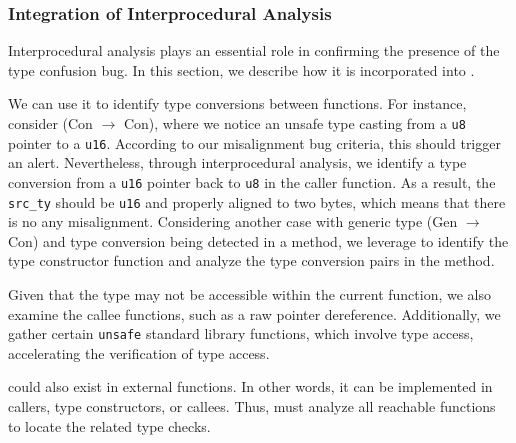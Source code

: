 \subsubsection{Integration of Interprocedural Analysis}
{
Interprocedural analysis plays an essential role in confirming the presence of the type confusion bug. In this section, we describe how it is incorporated into \bugdetector.}

\vspace{0.05in}
{We can use it to identify type conversions between functions. For instance, consider (Con $\rightarrow$ Con), where we notice an unsafe type casting from a \texttt{u8} pointer to a \texttt{u16}. According to our misalignment bug criteria, this should trigger an alert. Nevertheless, through interprocedural analysis, we identify a type conversion from a \texttt{u16} pointer back to \texttt{u8} in the caller function. As a result, the \texttt{src\_ty} should be \texttt{u16} and properly aligned to two bytes, which means that there is no any misalignment. Considering another case with generic type (Gen $\rightarrow$ Con) and type conversion being detected in a method, we leverage \pcg to identify the type constructor function and analyze the type conversion pairs in the method.}

\vspace{0.05in}
{Given that the type may not be accessible within the current function, we also examine the callee functions, such as a raw pointer dereference. Additionally, we gather certain \texttt{unsafe} standard library functions, which involve type access, accelerating the verification of type access.}

\vspace{0.05in}
{\TC could also exist in external functions. In other words, it can be implemented in callers, type constructors, or callees. Thus, \TN must analyze all reachable functions to locate the related type checks.}